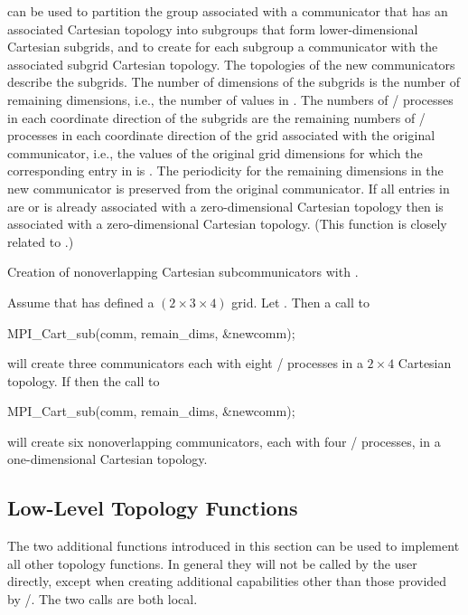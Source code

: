  can be used to partition the
group associated with a communicator that has an associated Cartesian topology
into subgroups that form lower-dimensional Cartesian
subgrids, and to create for each subgroup a communicator with the associated
subgrid Cartesian topology.
The topologies of the new communicators describe the subgrids.
The number of dimensions of the subgrids is the number of remaining dimensions, i.e., the number of  values in .
The numbers of \MPI/ processes in each coordinate direction of the subgrids are the remaining numbers of \MPI/ processes in each coordinate direction of the grid associated with the original communicator, i.e., the values of the original grid dimensions for which the corresponding entry in  is .
The periodicity for the remaining dimensions in the new communicator is preserved from the original communicator.
If all entries in  are  or  is already associated
with a zero-dimensional Cartesian topology then  is associated
with a zero-dimensional Cartesian topology. 
(This function is closely related to
.)

\begin{example}
\label{topol-exE}
%
Creation of nonoverlapping Cartesian subcommunicators with .

Assume that  has defined a
$(2 \times 3 \times 4)$ grid. Let .
Then a call to
\begin{mpicodeblock}
MPI\_Cart\_sub(comm, remain\_dims, \&newcomm);
\end{mpicodeblock}
\noindent will create three communicators each with eight \MPI/ processes
in a $2 \times 4$ Cartesian
topology.  If  then the call to
\begin{mpicodeblock}
MPI\_Cart\_sub(comm, remain\_dims, \&newcomm);
\end{mpicodeblock}
\noindent will create six nonoverlapping
communicators, each with four \MPI/ processes,
in a one-dimensional Cartesian topology.

\end{example}

\subsection{Low-Level Topology Functions}
\label{subsec:topol-lowlevel}
%
The two additional functions introduced in this section can be used to
implement all other topology functions. In general they will not be
called by the user directly, except when creating additional
 capabilities other than those provided by \MPI/.
The two calls are both local.

